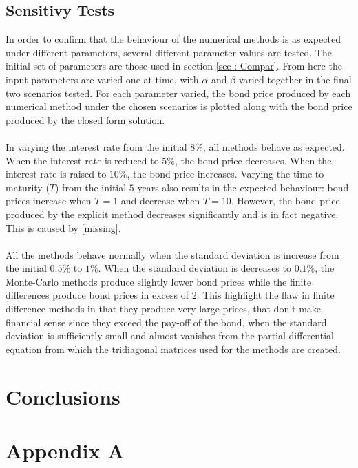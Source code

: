 \documentclass[12pt,a4paper]{article}
\begin{document}
\subsection{Sensitivy Tests}
In order to confirm that the behaviour of the numerical methods is as expected under different parameters, several different parameter values are tested. The initial set of parameters are those used in section \ref{sec : Compar}. From here the input parameters are varied one at time, with $\alpha$ and $\beta$ varied together in the final two scenarios tested. For each parameter varied, the bond price produced by each numerical method under the chosen scenarios is plotted along with the bond price produced by the closed form solution.\\\\
In varying the interest rate from the initial $8\%$, all methods behave as expected. When the interest rate is reduced to $5\%$, the bond price decreases. When the interest rate is raised to $10\%$, the bond price increases.	Varying the time to maturity ($T$) from the initial $5$ years also results in the expected behaviour: bond prices increase when $T=1$ and decrease when $T=10$. However, the bond price produced by the explicit method decreases significantly and is in fact negative. This is caused by [missing].\\\\
All the methods behave normally when the standard deviation is increase from the initial $0.5\%$ to $1\%$. When the standard deviation is decreases to $0.1\%$, the Monte-Carlo methods produce slightly lower bond prices while the finite differences produce bond prices in excess of 2. This highlight the flaw in finite difference methods in that they produce very large prices, that don't make financial sense since they exceed the pay-off of the bond, when the standard deviation is sufficiently small and almost vanishes from the partial differential equation from which the tridiagonal matrices used for the methods are created.
\
\newpage
\section{Conclusions}
\label{sec : Concl}



\newpage

	

\newpage
\appendix
\section{Appendix A}
\label{sec: Appendix A}
\end{document}
